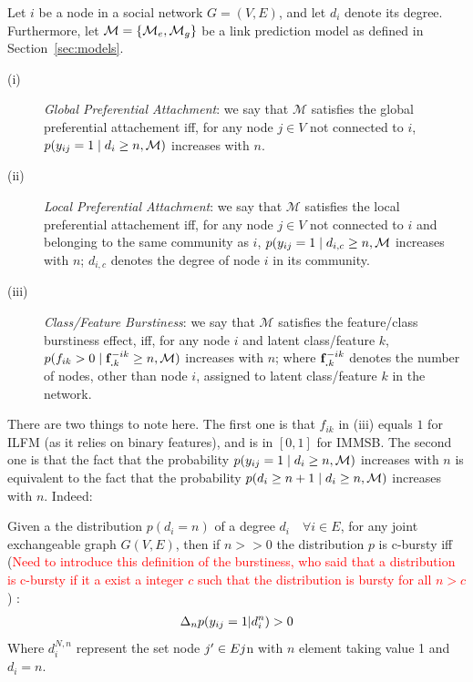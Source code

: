 \begin{definition}
Let $i$ be a node in a social network $G=(V,E)$, and let $d_i$ denote its degree. Furthermore, let $\mathcal{M}=\{\mathcal{M}_e, \mathcal{M}_g\}$ be a link prediction model as defined in Section~\ref{sec:models}.
\begin{description}
 \item[(i)] \emph{Global Preferential Attachment}: we say that $\mathcal{M}$ satisfies the global preferential attachement iff, for any node $j \in V$ not connected to $i$, $p(y_{ij}=1 \mid d_i \ge n, \mathcal{M})$ increases with $n$.
 \item[(ii)] \emph{Local Preferential Attachment}: we say that $\mathcal{M}$ satisfies the local preferential attachement iff, for any node $j \in V$ not connected to $i$ and belonging to the same community as $i$, $p(y_{ij}=1 \mid d_{i,c} \ge n, \mathcal{M}$ increases with $n$; $d_{i,c}$ denotes the degree of node $i$ in its community.
  \item[(iii)] \emph{Class/Feature Burstiness}: we say that $\mathcal{M}$ satisfies the feature/class burstiness effect, iff, for any node $i$ and latent class/feature $k$, $p(f_{ik} > 0 \mid \mathbf{f}_{\bm{.}k}^{-ik} \ge n, \mathcal{M})$ increases with $n$; where $\mathbf{f}_{\bm{.}k}^{-ik}$ denotes the number of nodes, other than node $i$, assigned to latent class/feature $k$ in the network.
\end{description}
\label{def:burst-soc-net}
\end{definition}
%
There are two things to note here. The first one is that $f_{ik}$ in (iii) equals $1$ for ILFM (as it relies on binary features), and is in $[0,1]$ for IMMSB. The second one is that the fact that the probability $p(y_{ij}=1 \mid d_i \ge n, \mathcal{M})$ increases with $n$ is equivalent to the fact that the probability $p(d_{i} \ge n+1 \mid d_i \ge n, \mathcal{M})$ increases with $n$. Indeed:






\begin{theorem}
	 Given a the distribution $p(d_i=n)$  of a degree $d_i \quad \forall i \in E$, for any joint exchangeable graph $G(V,E)$, then if $n >> 0$ the distribution $p$ is c-bursty iff (\textcolor{red}{Need to introduce this definition of the burstiness, who said that a distribution is c-bursty if it a exist a integer $c$ such that the distribution is bursty for all $n > c$}) :
	\begin{align}
	  \Delta_n p(y_{ij}=1 | d_i^{n}) > 0
	\end{align}
	Where $d_i^{N,n}$ represent the set node $j' \in E \\ j$n with $n$ element taking value 1 and $d_i=n$.
\end{theorem}

